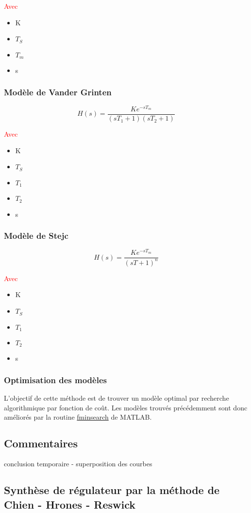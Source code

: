 \textcolor{red}{Avec}
\begin{itemize}
\item K 
\item $T_{S}$
\item $T_{m}$
\item s
\end{itemize}



\subsubsection{Modèle de Vander Grinten}
\begin{equation}
H(s) = \frac{K e^{-s T_{m}}}{(sT_{1} + 1) (sT_{2} + 1)}
\end{equation}

\textcolor{red}{Avec}
\begin{itemize}
\item K 
\item $T_{S}$
\item $T_{1}$
\item $T_{2}$
\item s
\end{itemize}

\subsubsection{Modèle de Stejc}
\begin{equation}
H(s) = \frac{K e^{-s T_{m}}}{(sT + 1)^{n}}
\end{equation}

\textcolor{red}{Avec}
\begin{itemize}
\item K 
\item $T_{S}$
\item $T_{1}$
\item $T_{2}$
\item s
\end{itemize}



\subsubsection{Optimisation des modèles}
L'objectif de cette méthode est de trouver un modèle optimal par recherche algorithmique par fonction de coût. Les modèles trouvés précédemment sont donc améliorés par la routine \url{fminsearch} de MATLAB.


\subsection{Commentaires}
conclusion temporaire - superposition des courbes 

\subsection{Synthèse de régulateur par la méthode de Chien - Hrones - Reswick}

